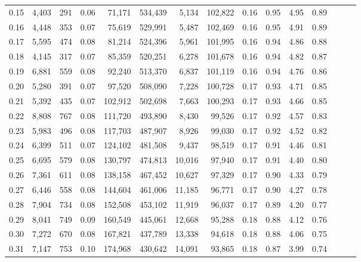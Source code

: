 \begin{tabular}{rrrrrrrrrrrrrrr}
0.15 &   4,403 &    291 &  0.06 &   71,171 &  534,439 &    5,134 &  102,822 &  0.16 &  0.95 &  4.95 &      0.89 \\
0.16 &   4,448 &    353 &  0.07 &   75,619 &  529,991 &    5,487 &  102,469 &  0.16 &  0.95 &  4.91 &      0.89 \\
0.17 &   5,595 &    474 &  0.08 &   81,214 &  524,396 &    5,961 &  101,995 &  0.16 &  0.94 &  4.86 &      0.88 \\
0.18 &   4,145 &    317 &  0.07 &   85,359 &  520,251 &    6,278 &  101,678 &  0.16 &  0.94 &  4.82 &      0.87 \\
0.19 &   6,881 &    559 &  0.08 &   92,240 &  513,370 &    6,837 &  101,119 &  0.16 &  0.94 &  4.76 &      0.86 \\
0.20 &   5,280 &    391 &  0.07 &   97,520 &  508,090 &    7,228 &  100,728 &  0.17 &  0.93 &  4.71 &      0.85 \\
0.21 &   5,392 &    435 &  0.07 &  102,912 &  502,698 &    7,663 &  100,293 &  0.17 &  0.93 &  4.66 &      0.85 \\
0.22 &   8,808 &    767 &  0.08 &  111,720 &  493,890 &    8,430 &   99,526 &  0.17 &  0.92 &  4.57 &      0.83 \\
0.23 &   5,983 &    496 &  0.08 &  117,703 &  487,907 &    8,926 &   99,030 &  0.17 &  0.92 &  4.52 &      0.82 \\
0.24 &   6,399 &    511 &  0.07 &  124,102 &  481,508 &    9,437 &   98,519 &  0.17 &  0.91 &  4.46 &      0.81 \\
0.25 &   6,695 &    579 &  0.08 &  130,797 &  474,813 &   10,016 &   97,940 &  0.17 &  0.91 &  4.40 &      0.80 \\
0.26 &   7,361 &    611 &  0.08 &  138,158 &  467,452 &   10,627 &   97,329 &  0.17 &  0.90 &  4.33 &      0.79 \\
0.27 &   6,446 &    558 &  0.08 &  144,604 &  461,006 &   11,185 &   96,771 &  0.17 &  0.90 &  4.27 &      0.78 \\
0.28 &   7,904 &    734 &  0.08 &  152,508 &  453,102 &   11,919 &   96,037 &  0.17 &  0.89 &  4.20 &      0.77 \\
0.29 &   8,041 &    749 &  0.09 &  160,549 &  445,061 &   12,668 &   95,288 &  0.18 &  0.88 &  4.12 &      0.76 \\
0.30 &   7,272 &    670 &  0.08 &  167,821 &  437,789 &   13,338 &   94,618 &  0.18 &  0.88 &  4.06 &      0.75 \\
0.31 &   7,147 &    753 &  0.10 &  174,968 &  430,642 &   14,091 &   93,865 &  0.18 &  0.87 &  3.99 &      0.74 \\

\end{tabular}
